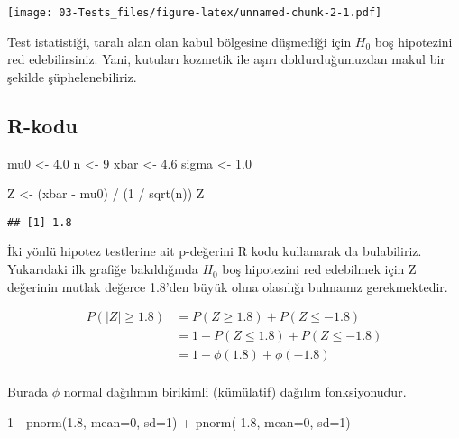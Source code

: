 \documentclass[
  12pt,
]{book}
\newenvironment{Shaded}{\begin{snugshade}}{\end{snugshade}}
\newcommand{\AttributeTok}[1]{\textcolor[rgb]{0.77,0.63,0.00}{#1}}
\newcommand{\DecValTok}[1]{\textcolor[rgb]{0.00,0.00,0.81}{#1}}
\newcommand{\FloatTok}[1]{\textcolor[rgb]{0.00,0.00,0.81}{#1}}
\newcommand{\FunctionTok}[1]{\textcolor[rgb]{0.00,0.00,0.00}{#1}}
\newcommand{\NormalTok}[1]{#1}
\newcommand{\OtherTok}[1]{\textcolor[rgb]{0.56,0.35,0.01}{#1}}
\newcommand{\SpecialCharTok}[1]{\textcolor[rgb]{0.00,0.00,0.00}{#1}}
\begin{document}
\texttt{[image: 03-Tests\_files/figure-latex/unnamed-chunk-2-1.pdf]}

Test istatistiği, taralı alan olan kabul bölgesine düşmediği için \(H_{0}\) boş hipotezini red edebilirsiniz. Yani, kutuları kozmetik ile aşırı doldurduğumuzdan makul bir şekilde şüphelenebiliriz.

\hypertarget{r-kodu}{%
\subsection{R-kodu}\label{r-kodu}}

\begin{Shaded}
\begin{Highlighting}[]
\NormalTok{mu0 }\OtherTok{\textless{}{-}} \FloatTok{4.0}
\NormalTok{n }\OtherTok{\textless{}{-}} \DecValTok{9}
\NormalTok{xbar }\OtherTok{\textless{}{-}} \FloatTok{4.6}
\NormalTok{sigma }\OtherTok{\textless{}{-}} \FloatTok{1.0}

\NormalTok{Z }\OtherTok{\textless{}{-}}\NormalTok{ (xbar }\SpecialCharTok{{-}}\NormalTok{ mu0) }\SpecialCharTok{/}\NormalTok{ (}\DecValTok{1} \SpecialCharTok{/} \FunctionTok{sqrt}\NormalTok{(n))}
\NormalTok{Z}
\end{Highlighting}
\end{Shaded}

\begin{verbatim}
## [1] 1.8
\end{verbatim}

İki yönlü hipotez testlerine ait p-değerini R kodu kullanarak da bulabiliriz. Yukarıdaki ilk grafiğe bakıldığında \(H_{0}\) boş hipotezini red edebilmek için Z değerinin mutlak değerce 1.8'den büyük olma olasılığı bulmamız gerekmektedir.

\begin{equation}
\begin{split}
P \left( |Z| \geq 1.8 \right) &= P(Z \geq 1.8) + P(Z \leq -1.8) \\
&= 1 - P(Z \leq 1.8) + P(Z \leq -1.8) \\
&= 1 - \phi(1.8) +\phi(-1.8)\\
\end{split}
\end{equation}

Burada \(\phi\) normal dağılımın birikimli (kümülatif) dağılım fonksiyonudur.

\begin{Shaded}
\begin{Highlighting}[]
\DecValTok{1} \SpecialCharTok{{-}} \FunctionTok{pnorm}\NormalTok{(}\FloatTok{1.8}\NormalTok{, }\AttributeTok{mean=}\DecValTok{0}\NormalTok{, }\AttributeTok{sd=}\DecValTok{1}\NormalTok{) }\SpecialCharTok{+} \FunctionTok{pnorm}\NormalTok{(}\SpecialCharTok{{-}}\FloatTok{1.8}\NormalTok{, }\AttributeTok{mean=}\DecValTok{0}\NormalTok{, }\AttributeTok{sd=}\DecValTok{1}\NormalTok{)}
\end{Highlighting}
\end{Shaded}
\end{document}
